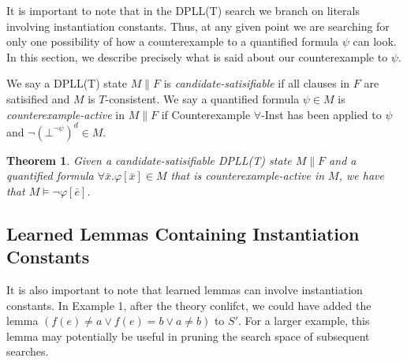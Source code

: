\documentclass{llncs}
\newtheorem{thm}{Theorem}
\begin{document}
It is important to note that in the DPLL(T) search we branch on literals involving instantiation constants.
Thus, at any given point we are searching for only one possibility of how a counterexample to a quantified formula $\psi$ can look.
In this section, we describe precisely what is said about our counterexample to $\psi$.

We say a DPLL(T) state $M \parallel F$ is \emph{candidate-satisifiable} if all clauses in $F$ are satisified and $M$ is $T$-consistent.
We say a quantified formula $\psi \in M$ is \emph{counterexample-active} in $M \parallel F$ if Counterexample $\forall$-Inst has been applied to $\psi$ and $\neg (\bot^{\neg \psi})^d \in M$.

\begin{thm}
\label{thm:cerep}
Given a candidate-satisifiable DPLL(T) state $M \parallel F$ and a quantified formula $\forall \bar{x}. \varphi[ \bar{x} ] \in M$ that is counterexample-active in $M$, we have that $M \models \neg \varphi[\bar{e}]$.
\end{thm}

\subsection{Learned Lemmas Containing Instantiation Constants}

It is also important to note that learned lemmas can involve instantiation constants.
In Example 1, after the theory conlifct, we could have added the lemma $( f( e ) \neq a \vee f( e ) = b \vee a \neq b )$ to $S'$.
For a larger example, this lemma may potentially be useful in pruning the search space of subsequent searches.

\begin{comment}
It is also important to note that learned lemmas can involve instantiation constants.
In this example, after the theory conlifct, we could have added the lemma $(\varphi_1 : ) ( f( e ) \neq a \vee f( e ) = b \vee a \neq b )$ to $S'$.
In this case, we may apply Decide to come to the state $( a = b ), \psi, (\bot^{\neg \psi}), (f( e ) \neq a)^d \parallel S' \cup \varphi$, where again all clauses are satisfied, and the solver answers SAT in the same manner.

However, note that the lemma $\varphi_1$ is only useful in contexts in which $\psi$ is asserted.
In other words, the solver should not be searching for values of counterexamples to quantified formulas $\psi$ when $\psi$ is not asserted.
We will see in Section~\ref{sec:implementation} a recommended implementation for which this concern is addressed.
[do this: do these lemmas pollute the DPLL(T) space?  When should we forget them?  Should we give them to minisat?]
[do this: examine elaborating lemmas involving instantiation constants as being lemmas involving universal statements, justify as well]
\end{comment}
\end{document}
